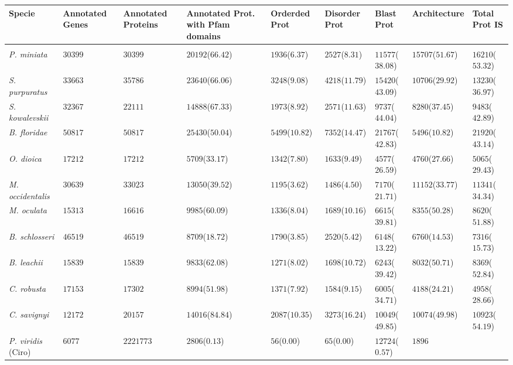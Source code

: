 \documentclass[11pt]{article}
\begin{document}
\begin{table}
\small
\centering
\begin{tabular}{p{3.2cm}p{2cm}p{2cm}p{2cm}p{2cm}p{2cm}p{2cm}p{2.7cm}p{2.6cm}}
\toprule
\textbf{Specie}&\textbf{Annotated Genes}&\textbf{Annotated 
Proteins}&\textbf{Annotated Prot. with Pfam domains}&\textbf{Orderded 
Prot}&\textbf{Disorder Prot}&\textbf{Blast 
Prot}&\textbf{Architecture}&\textbf{Total Prot IS} \\ 
\midrule \\
\textsl{P. miniata}&    
$30399$&$30399$&$20192$($66.42$)&$1936$($6.37$)&$2527$($8.31$)&$11577$($38.08$)&
$15707$($51.67$)&$16210$($53.32$)\\
\textsl{S. purpuratus}& 
$33663$&$35786$&$23640$($66.06$)&$3248$($9.08$)&$4218$($11.79$)&$15420$($43.09$)
&$10706$($29.92$)&$13230$($36.97$)\\
\textsl{S. kowalevskii}&        
$32367$&$22111$&$14888$($67.33$)&$1973$($8.92$)&$2571$($11.63$)&$9737$($44.04$)&
$8280$($37.45$)&$9483$($42.89$)\\
\midrule
\textsl{B. floridae}&   $50817$&$50817$&$25430$($50.04$)&$5499$($10.82$)&$7352$($14.47$)&$21767$($
42.83$)&$5496$($10.82$)&$21920$($43.14$)\\
\textsl{O. dioica}&$17212$&$17212$&$5709$($33.17$)&$1342$($7.80$)&$1633$($9.49$)&$4577$($26.5
9$)&$4760$($27.66$)&$5065$($29.43$)\\
\textsl{M. occidentalis}&       
$30639$&$33023$&$13050$($39.52$)&$1195$($3.62$)&$1486$($4.50$)&$7170$($21.71$)&$
11152$($33.77$)&$11341$($34.34$)\\
\textsl{M. oculata}&    
$15313$&$16616$&$9985$($60.09$)&$1336$($8.04$)&$1689$($10.16$)&$6615$($39.81$)&$
8355$($50.28$)&$8620$($51.88$)\\
\textsl{B. schlosseri}& $46519$&$46519$&$8709$($18.72$)&$1790$($3.85$)&$2520$($5.42$)&$6148$($13.2
2$)&$6760$($14.53$)&$7316$($15.73$)\\
\textsl{B. leachii }&   
$15839$&$15839$&$9833$($62.08$)&$1271$($8.02$)&$1698$($10.72$)&$6243$($39.42$)&$
8032$($50.71$)&$8369$($52.84$)\\
\textsl{C. robusta} 
&$17153$&$17302$&$8994$($51.98$)&$1371$($7.92$)&$1584$($9.15$)&$6005$($34.71$)&$
4188$($24.21$)&$4958$($28.66$)\\
\textsl{C. savignyi}&
$12172$&$20157$&$14016$($84.84$)&$2087$($10.35$)&$3273$($16.24$)&$10049$($
49.85$)&$10074$($49.98$)&$10923$($54.19$)\\
\textsl{P. viridis} (Ciro)&     
$6077$&$2221773$&$2806$($0.13$)&$56$($0.00$)&$65$($0.00$)&$12724$($0.57$)&$1896$

\end{tabular}
\end{table}
\end{document}
